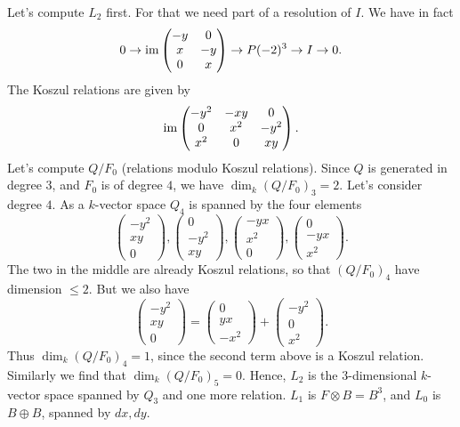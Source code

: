 \documentclass[11pt, english]{article}
\begin{document}
\begin{sol}
Let's compute $L_2$ first. For that we need part of a resolution of $I$. We have in fact
\[
0 \to \operatorname{im} \begin{pmatrix} -y & 0 \\ x & -y \\ 0 & x \end{pmatrix} \to P(-2)^3 \to I \to 0.
\]
The Koszul relations are given by 
\[
\operatorname{im} \begin{pmatrix}
-y^2 & -xy & 0 \\
0 & x^2 & -y^2 \\
x^2 & 0 & xy
\end{pmatrix}.
\]
Let's compute $Q/F_0$ (relations modulo Koszul relations). Since $Q$ is generated in degree $3$, and $F_0$ is of degree $4$, we have $\dim_k (Q/F_0)_3 = 2$. Let's consider degree $4$. As a $k$-vector space $Q_4$ is spanned by the four elements
\[
\begin{pmatrix}
  -y^2 \\ xy \\ 0 
\end{pmatrix},
\begin{pmatrix}
  0 \\ -y^2 \\ xy 
\end{pmatrix},
\begin{pmatrix}
  -yx \\ x^2 \\ 0
\end{pmatrix},
\begin{pmatrix}
  0 \\ -yx \\ x^2
\end{pmatrix}.
\]
The two in the middle are already Koszul relations, so that $(Q/F_0)_4$ have dimension $\leq 2$. But we also have
\[
\begin{pmatrix}
  -y^2 \\ xy \\ 0
\end{pmatrix} = 
\begin{pmatrix}
0 \\ yx \\ -x^2 
\end{pmatrix}
+
\begin{pmatrix}
-y^2 \\ 0 \\ x^2
\end{pmatrix}.
\]
Thus $\dim_k (Q/F_0)_4=1$, since the second term above is a Koszul relation. Similarly we find that $\dim_k (Q/F_0)_5 =0$. Hence, $L_2$ is the $3$-dimensional $k$-vector space spanned by $Q_3$ and one more relation. $L_1$ is $F \otimes B=B^3$, and $L_0$ is $B \oplus B$, spanned by $dx,dy$.


\end{sol}
\end{document}
